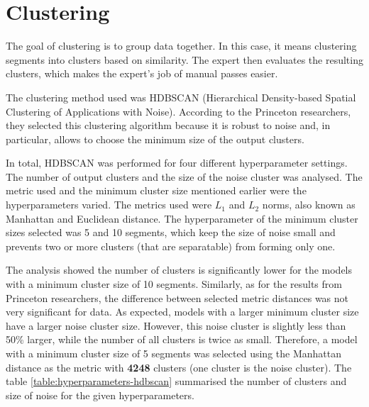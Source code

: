     \section{Clustering}
        The goal of clustering is to group data together. In this case, it means clustering segments into clusters based on similarity. The expert then evaluates the resulting clusters, which makes the expert's job of manual passes easier.

        The clustering method used was HDBSCAN (Hierarchical Density-based Spatial Clustering of Applications with Noise). According to the Princeton researchers, they selected this clustering algorithm because it is robust to noise and, in particular, allows to choose the minimum size of the output clusters.

        In total, HDBSCAN was performed for four different hyperparameter settings. The number of output clusters and the size of the noise cluster was analysed.  The metric used and the minimum cluster size mentioned earlier were the hyperparameters varied. The metrics used were $L_{1}$ and $L_{2}$ norms, also known as Manhattan and Euclidean distance. The hyperparameter of the minimum cluster sizes selected was 5 and 10 segments, which keep the size of noise small and prevents two or more clusters (that are separatable) from forming only one.

        The analysis showed the number of clusters is significantly lower for the models with a minimum cluster size of 10 segments. Similarly, as for the results from Princeton researchers, the difference between selected metric distances was not very significant for data. As expected, models with a larger minimum cluster size have a larger noise cluster size. However, this noise cluster is slightly less than 50\% larger, while the number of all clusters is twice as small. Therefore, a model with a minimum cluster size of 5 segments was selected using the Manhattan distance as the metric with \textbf{4248} clusters (one cluster is the noise cluster). The table \ref{table:hyperparameters-hdbscan} summarised the number of clusters and size of noise for the given hyperparameters. 


